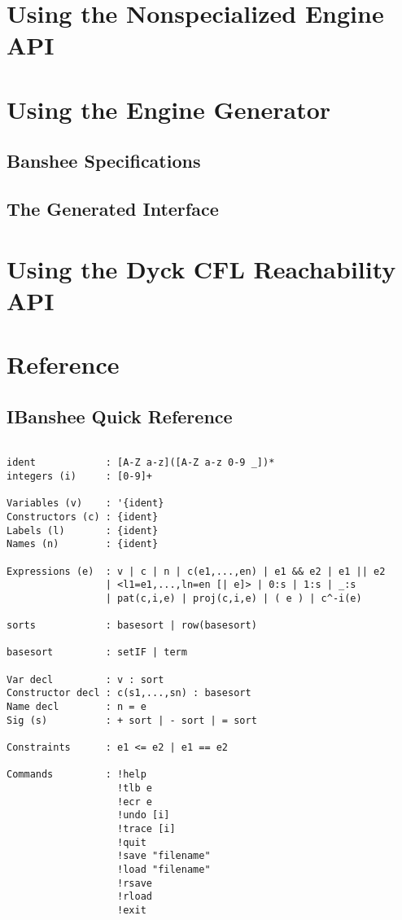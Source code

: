 \documentclass[10pt]{article}
\begin{document}
\section{Using the Nonspecialized Engine API} 
\label{sec-nonspec}

\section{Using the Engine Generator}
\label{sec-spec}

\subsection{Banshee Specifications}

\subsection{The Generated Interface}

\section{Using the Dyck CFL Reachability API}
\label{sec-dyckcfl}

\section{Reference}
\label{sec-reference}

\subsection{IBanshee Quick Reference}
\begin{verbatim}

ident            : [A-Z a-z]([A-Z a-z 0-9 _])*
integers (i)     : [0-9]+

Variables (v)    : '{ident}
Constructors (c) : {ident}
Labels (l)       : {ident}
Names (n)        : {ident}

Expressions (e)  : v | c | n | c(e1,...,en) | e1 && e2 | e1 || e2
                 | <l1=e1,...,ln=en [| e]> | 0:s | 1:s | _:s
                 | pat(c,i,e) | proj(c,i,e) | ( e ) | c^-i(e)

sorts            : basesort | row(basesort)

basesort         : setIF | term

Var decl         : v : sort
Constructor decl : c(s1,...,sn) : basesort
Name decl        : n = e 
Sig (s)          : + sort | - sort | = sort

Constraints      : e1 <= e2 | e1 == e2

Commands         : !help
                   !tlb e
                   !ecr e
                   !undo [i]
                   !trace [i]
                   !quit
                   !save "filename"
                   !load "filename"
                   !rsave
                   !rload
                   !exit
\end{verbatim}
\end{document}

